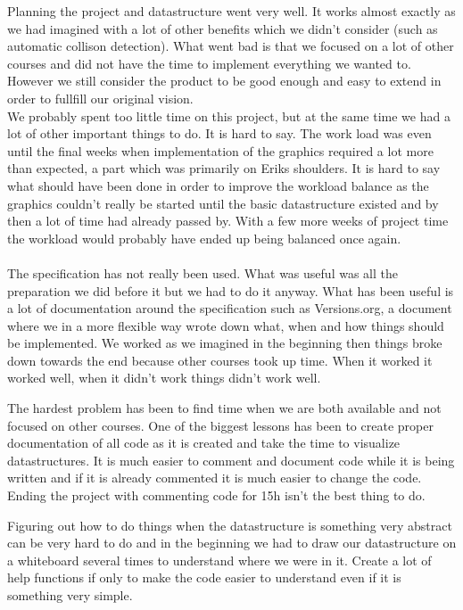 \documentclass[12pt,a4paper]{article}
\begin{document}
Planning the project and datastructure went very well. It works almost exactly as we had imagined with a lot of other benefits which we didn't consider (such as automatic collison detection). What went bad is that we focused on a lot of other courses and did not have the time to implement everything we wanted to. However we still consider the product to be good enough and easy to extend in order to fullfill our original vision.
\\
We probably spent too little time on this project, but at the same time we had a lot of other important things to do. It is hard to say.
The work load was even until the final weeks when implementation of the graphics required a lot more than expected, a part which was primarily on Eriks shoulders.
It is hard to say what should have been done in order to improve the workload balance as the graphics couldn't really be started until the basic datastructure existed and by then a lot of time had already passed by. With a few more weeks of project time the workload would probably have ended up being balanced once again.
\\ \\
The specification has not really been used. What was useful was all the preparation we did before it but we had to do it anyway.
What has been useful is a lot of documentation around the specification such as Versions.org, a document where we in a more flexible way wrote down what, when and how things should be implemented.
We worked as we imagined in the beginning then things broke down towards the end because other courses took up time. When it worked it worked well, when it didn't work things didn't work well.

The hardest problem has been to find time when we are both available and not focused on other courses.
One of the biggest lessons has been to create proper documentation of all code as it is created and take the time to visualize datastructures.
It is much easier to comment and document code while it is being written and if it is already commented it is much easier to change the code.
Ending the project with commenting code for 15h isn't the best thing to do.

Figuring out how to do things when the datastructure is something very abstract can be very hard to do and in the beginning we had to draw our datastructure on a whiteboard several times to understand where we were in it.
Create a lot of help functions if only to make the code easier to understand even if it is something very simple.
\end{document}
